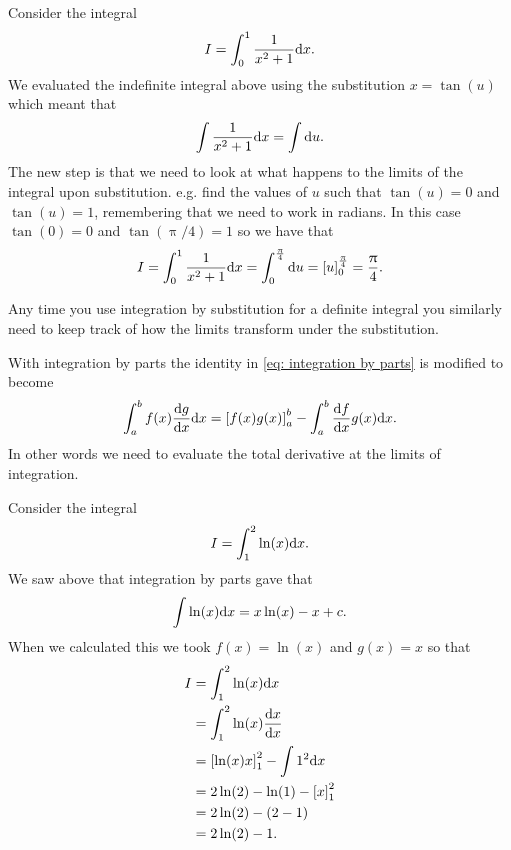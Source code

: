 \begin{ex}
Consider the integral 
\begin{equation*}
I=\int_{0}^{1}\frac{1}{x^{2}+1}\mathrm{d} x.
\end{equation*}
We evaluated the indefinite integral above using the substitution $x=\tan(u)$ which meant that
\begin{equation*}
\int\frac{1}{x^{2}+1}\mathrm{d} x=\int\mathrm{d} u.
\end{equation*}
The new step is that we need to look at what happens to the limits of the integral upon substitution. e.g. find the values of $u$ such that $\tan(u)=0$ and $\tan(u)=1$, remembering that we need to work in radians. In this case $\tan(0)=0$ and $\tan(\uppi/4)=1$ so we have that 
\begin{equation*}
I=\int_{0}^{1}\frac{1}{x^{2}+1}\mathrm{d} x=\int_{0}^{\frac{\uppi}{4}}\mathrm{d} u=\left[u\right]^{\frac{\uppi}{4}}_{0}=\frac{\uppi}{4}.
\end{equation*}
\end{ex}

Any time you use integration by substitution for a definite integral you similarly need to keep track of how the limits transform under the substitution.

With integration by parts the identity in \cref{eq: integration by parts} is modified to become
\begin{equation}
\int^{b}_{a} f(x)\frac{\mathrm{d} g}{\mathrm{d} x}\mathrm{d} x =\left[f(x)g(x)\right]_{a}^{b}-\int_{a}^{b}\frac{\mathrm{d} f}{\mathrm{d} x}g(x)\mathrm{d} x.
\end{equation}
In other words we need to evaluate the total derivative at the limits of integration.

\begin{ex}
Consider the integral
\begin{equation*}
I=\int_{1}^{2}\ln(x)\mathrm{d} x.
\end{equation*}
We saw above that integration by parts gave that 
\begin{equation*}
\int\ln(x)\mathrm{d} x=x\ln(x)-x+c.
\end{equation*}
When we calculated this we took $f(x)=\ln(x)$ and $g(x)=x$ so that
\begin{align*}
I 	&=\int_{1}^{2}\ln(x)\mathrm{d} x\\
	&=\int_{1}^{2}\ln(x)\frac{\mathrm{d} x}{\mathrm{d} x}\\
	&=\left[\ln(x)x\right]_{1}^{2}-\int{1}^{2}\mathrm{d} x\\
	&=2\ln(2)-\ln(1)-\left[x\right]_{1}^{2}\\
	&=2\ln(2)-(2-1)\\
	&=2\ln(2)-1.
\end{align*}

\end{ex} 

